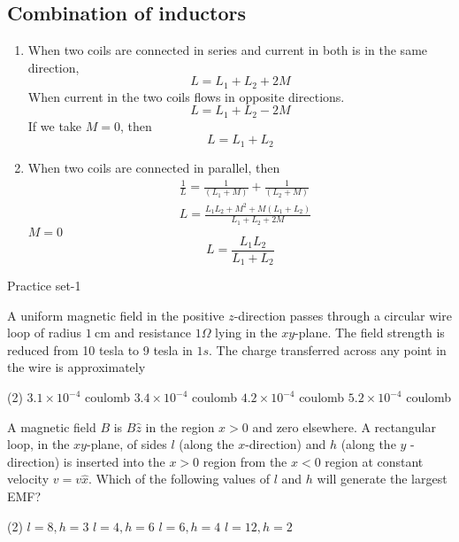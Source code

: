 \subsection{Combination of inductors}
\begin{enumerate}
	\item When two coils are connected in series and current in both is in the same direction,
	$$
	L=L_{1}+L_{2}+2 M
	$$
	When current in the two coils flows in opposite directions.
	$$
	L=L_{1}+L_{2}-2 M
	$$
	If we take $M=0$, then
	$$
	L=L_{1}+L_{2}
	$$
	\item When two coils are connected in parallel, then
	$$
	\begin{aligned}
	&\frac{1}{L}=\frac{1}{\left(L_{1}+M\right)}+\frac{1}{\left(L_{2}+M\right)} \\
	&L=\frac{L_{1} L_{2}+M^{2}+M\left(L_{1}+L_{2}\right)}{L_{1}+L_{2}+2 M}
	\end{aligned}
	$$
	$M=0$\\
	$$L=\frac{L_{1} L_{2}}{L_{1}+L_{2}}$$
\end{enumerate}
\newpage
\begin{abox}
	Practice set-1
\end{abox}
\begin{enumerate}
	\begin{minipage}{\textwidth}
		\item A uniform magnetic field in the positive $z$-direction passes through a circular wire loop of radius $1 \mathrm{~cm}$ and resistance $1 \Omega$ lying in the $x y$-plane. The field strength is reduced from 10 tesla to 9 tesla in $1 s$. The charge transferred across any point in the wire is approximately
	\end{minipage}
	\begin{tasks}(2)
		\task[\textbf{A.}]$3.1 \times 10^{-4}$ coulomb
		\task[\textbf{B.}] $3.4 \times 10^{-4}$ coulomb
		\task[\textbf{C.}] $4.2 \times 10^{-4}$ coulomb
		\task[\textbf{D.}]$5.2 \times 10^{-4}$ coulomb
	\end{tasks}
	\begin{minipage}{\textwidth}
		\item A magnetic field $B$ is $B \hat{z}$ in the region $x>0$ and zero elsewhere. A rectangular loop, in the $x y$-plane, of sides $l$ (along the $x$-direction) and $h$ (along the $y$ - direction) is inserted into the $x>0$ region from the $x<0$ region at constant velocity $v=v \hat{x}$. Which of the following values of $l$ and $h$ will generate the largest EMF?
	\end{minipage}
	\begin{tasks}(2)
		\task[\textbf{A.}] $l=8, h=3$
		\task[\textbf{B.}]$l=4, h=6$
		\task[\textbf{C.}]$l=6, h=4$
		\task[\textbf{D.}]$l=12, h=2$
	\end{tasks}
\end{enumerate}

